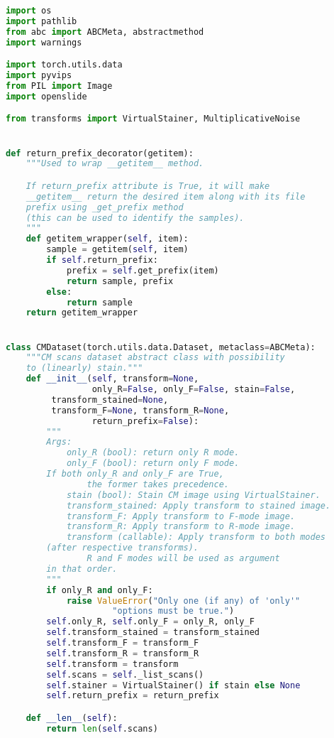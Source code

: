 \documentclass[../main.tex]{subfiles}
\begin{document}
\begin{lstlisting}[language=Python]
import os
import pathlib
from abc import ABCMeta, abstractmethod
import warnings

import torch.utils.data
import pyvips
from PIL import Image
import openslide

from transforms import VirtualStainer, MultiplicativeNoise


def return_prefix_decorator(getitem):
    """Used to wrap __getitem__ method.

    If return_prefix attribute is True, it will make
    __getitem__ return the desired item along with its file
    prefix using _get_prefix method
    (this can be used to identify the samples).
    """
    def getitem_wrapper(self, item):
        sample = getitem(self, item)
        if self.return_prefix:
            prefix = self.get_prefix(item)
            return sample, prefix
        else:
            return sample
    return getitem_wrapper


class CMDataset(torch.utils.data.Dataset, metaclass=ABCMeta):
    """CM scans dataset abstract class with possibility
    to (linearly) stain."""
    def __init__(self, transform=None,
                 only_R=False, only_F=False, stain=False,
		 transform_stained=None,
		 transform_F=None, transform_R=None,
                 return_prefix=False):
        """
        Args:
            only_R (bool): return only R mode.
            only_F (bool): return only F mode.
		If both only_R and only_F are True,
                the former takes precedence.
            stain (bool): Stain CM image using VirtualStainer.
            transform_stained: Apply transform to stained image.
            transform_F: Apply transform to F-mode image.
            transform_R: Apply transform to R-mode image.
            transform (callable): Apply transform to both modes
		(after respective transforms).
                R and F modes will be used as argument
		in that order.
        """
        if only_R and only_F:
            raise ValueError("Only one (if any) of 'only'"
	    		     "options must be true.")
        self.only_R, self.only_F = only_R, only_F
        self.transform_stained = transform_stained
        self.transform_F = transform_F
        self.transform_R = transform_R
        self.transform = transform
        self.scans = self._list_scans()
        self.stainer = VirtualStainer() if stain else None
        self.return_prefix = return_prefix

    def __len__(self):
        return len(self.scans)


\end{lstlisting}
\end{document}
